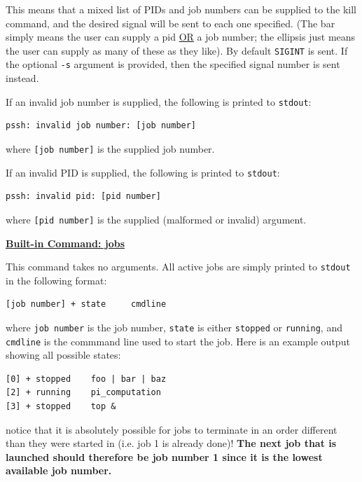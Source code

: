 \documentclass[10pt]{article}
\begin{document}
This means that a mixed list of PIDs and job numbers can be supplied to
the kill command, and the desired signal will be sent to each one
specified.  (The bar simply means the user can supply a pid
\underline{OR} a job number; the ellipsis just means the user can
supply as many of these as they like).  By default \texttt{SIGINT} is
sent.  If the optional \texttt{-s} argument is provided, then the
specified signal number is sent instead.

If an invalid job number is supplied, the following is printed to
\texttt{stdout}:

\begin{verbatim}
pssh: invalid job number: [job number]
\end{verbatim}
where \texttt{[job number]} is the supplied job number.

If an invalid PID is supplied, the following is printed to
\texttt{stdout}:

\begin{verbatim}
pssh: invalid pid: [pid number]
\end{verbatim}
where \texttt{[pid number]} is the supplied (malformed or invalid) argument.


\vspace{12pt}
\textbf{\underline{Built-in Command: jobs}}

This command takes no arguments.  All active jobs are simply printed to
\texttt{stdout} in the following format:

\begin{verbatim}
[job number] + state     cmdline
\end{verbatim}

where \texttt{job number} is the job number, \texttt{state} is either
\texttt{stopped} or \texttt{running}, and \texttt{cmdline} is the
commmand line used to start the job.  Here is an example output showing
all possible states:

\begin{verbatim}
[0] + stopped    foo | bar | baz
[2] + running    pi_computation
[3] + stopped    top &
\end{verbatim}


notice that it is absolutely possible for jobs to terminate in an order
different than they were started in (i.e. job 1 is already done)!
\textbf{The next job that is launched should therefore be job number 1
since it is the lowest available job number.}
\end{document}
